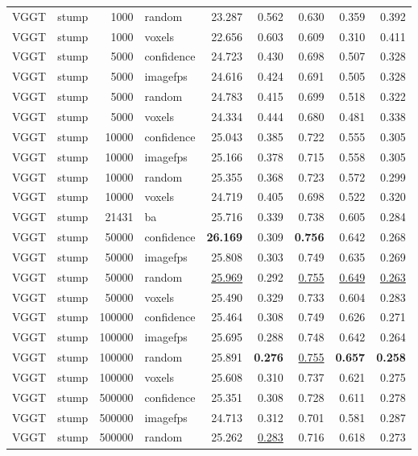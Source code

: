 \begin{table}[H]
\begin{tabular}{llrlrrrrr}
VGGT & stump & 1000 & random & 23.287 & 0.562 & 0.630 & 0.359 & 0.392 \\
VGGT & stump & 1000 & voxels & 22.656 & 0.603 & 0.609 & 0.310 & 0.411 \\
VGGT & stump & 5000 & confidence & 24.723 & 0.430 & 0.698 & 0.507 & 0.328 \\
VGGT & stump & 5000 & imagefps & 24.616 & 0.424 & 0.691 & 0.505 & 0.328 \\
VGGT & stump & 5000 & random & 24.783 & 0.415 & 0.699 & 0.518 & 0.322 \\
VGGT & stump & 5000 & voxels & 24.334 & 0.444 & 0.680 & 0.481 & 0.338 \\
VGGT & stump & 10000 & confidence & 25.043 & 0.385 & 0.722 & 0.555 & 0.305 \\
VGGT & stump & 10000 & imagefps & 25.166 & 0.378 & 0.715 & 0.558 & 0.305 \\
VGGT & stump & 10000 & random & 25.355 & 0.368 & 0.723 & 0.572 & 0.299 \\
VGGT & stump & 10000 & voxels & 24.719 & 0.405 & 0.698 & 0.522 & 0.320 \\
VGGT & stump & 21431 & ba & 25.716 & 0.339 & 0.738 & 0.605 & 0.284 \\
VGGT & stump & 50000 & confidence & \textbf{26.169} & 0.309 & \textbf{0.756} & 0.642 & 0.268 \\
VGGT & stump & 50000 & imagefps & 25.808 & 0.303 & 0.749 & 0.635 & 0.269 \\
VGGT & stump & 50000 & random & \underline{25.969} & 0.292 & \underline{0.755} & \underline{0.649} & \underline{0.263} \\
VGGT & stump & 50000 & voxels & 25.490 & 0.329 & 0.733 & 0.604 & 0.283 \\
VGGT & stump & 100000 & confidence & 25.464 & 0.308 & 0.749 & 0.626 & 0.271 \\
VGGT & stump & 100000 & imagefps & 25.695 & 0.288 & 0.748 & 0.642 & 0.264 \\
VGGT & stump & 100000 & random & 25.891 & \textbf{0.276} & \underline{0.755} & \textbf{0.657} & \textbf{0.258} \\
VGGT & stump & 100000 & voxels & 25.608 & 0.310 & 0.737 & 0.621 & 0.275 \\
VGGT & stump & 500000 & confidence & 25.351 & 0.308 & 0.728 & 0.611 & 0.278 \\
VGGT & stump & 500000 & imagefps & 24.713 & 0.312 & 0.701 & 0.581 & 0.287 \\
VGGT & stump & 500000 & random & 25.262 & \underline{0.283} & 0.716 & 0.618 & 0.273 \\

\end{tabular}
\end{table}
